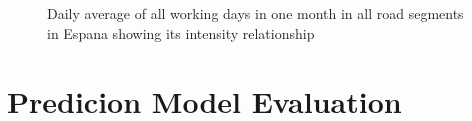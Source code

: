 \begin{figure}[h] 
\centering
    \centering
      \captionsetup{justification=centering}
    \hfill
    \caption{Daily average of all working days in one month in all road segments in Espana showing its intensity relationship}

    \label{figure_traffic_espana}
\end{figure}

































 \pagebreak[4]
\section{Predicion Model Evaluation}

